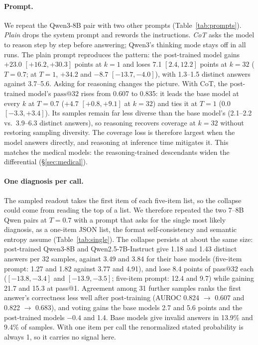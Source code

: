 \documentclass[11pt]{article}
\makeatletter
\newcommand{\passk}[1]{\mathrm{pass@}#1}
\makeatother
\begin{document}
\paragraph{Prompt.} We repeat the Qwen3-8B pair with two other prompts (Table~\ref{tab:prompts}). \emph{Plain} drops the system prompt and rewords the instructions. \emph{CoT} asks the model to reason step by step before answering; Qwen3's thinking mode stays off in all runs.
The plain prompt reproduces the pattern: the post-trained model gains $+23.0$ $[+16.2,+30.3]$ points at $k{=}1$ and loses 7.1 $[2.4,12.2]$ points at $k{=}32$ ($T{=}0.7$; at $T{=}1$, $+34.2$ and $-8.7$ $[-13.7,-4.0]$), with 1.3--1.5 distinct answers against 3.7--5.6.
Asking for reasoning changes the picture. With CoT, the post-trained model's $\passk{32}$ rises from 0.607 to 0.835: it leads the base model at every $k$ at $T{=}0.7$ ($+4.7$ $[+0.8,+9.1]$ at $k{=}32$) and ties it at $T{=}1$ ($0.0$ $[-3.3,+3.4]$).
Its samples remain far less diverse than the base model's (2.1--2.2 vs.\ 3.9--6.3 distinct answers), so reasoning recovers coverage at $k{=}32$ without restoring sampling diversity.
The coverage loss is therefore largest when the model answers directly, and reasoning at inference time mitigates it. This matches the medical models: the reasoning-trained descendants widen the differential (\S\ref{sec:medical}).

\paragraph{One diagnosis per call.} The sampled readout takes the first item of each five-item list, so the collapse could come from reading the top of a list. We therefore repeated the two 7--8B Qwen pairs at $T{=}0.7$ with a prompt that asks for the single most likely diagnosis, as a one-item JSON list, the format self-consistency and semantic entropy assume (Table~\ref{tab:single}). The collapse persists at about the same size: post-trained Qwen3-8B and Qwen2.5-7B-Instruct give 1.18 and 1.43 distinct answers per 32 samples, against 3.49 and 3.84 for their base models (five-item prompt: 1.27 and 1.82 against 3.77 and 4.91), and lose 8.4 points of pass@32 each ($[-13.8,-3.4]$ and $[-13.9,-3.5]$; five-item prompt: 12.4 and 9.7) while gaining 21.7 and 15.3 at pass@1. Agreement among 31 further samples ranks the first answer's correctness less well after post-training (AUROC 0.824 $\rightarrow$ 0.607 and 0.822 $\rightarrow$ 0.683), and voting gains the base models 2.7 and 5.6 points and the post-trained models $-0.4$ and 1.4. Base models give invalid answers in 13.9\% and 9.4\% of samples. With one item per call the renormalized stated probability is always 1, so it carries no signal here.
\end{document}
